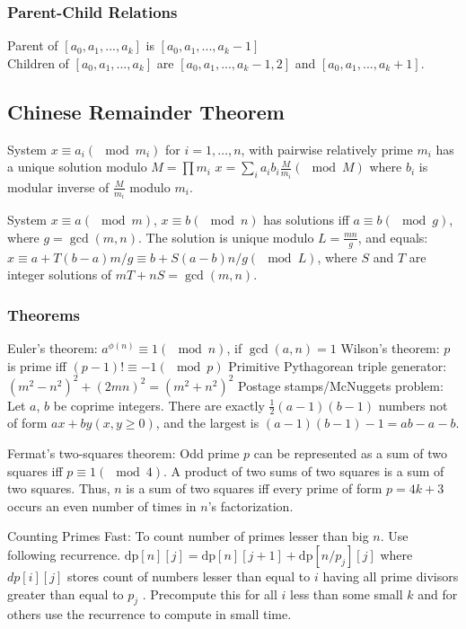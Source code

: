 \subsubsection{Parent-Child Relations}
Parent of $ [a_0, a_1, ..., a_k] $ is $ [a_0, a_1, ..., a_k-1] $ \\
Children of $[a_0, a_1, ..., a_k]$ are $[a_0, a_1, ..., a_k-1, 2]$ and $[a_0, a_1, ..., a_k+1]$.


\subsection{Chinese Remainder Theorem}

System $x \equiv a_i(\mod m_i)$ for $i = 1, \ldots, n$, with pairwise relatively prime $m_i$ has a unique solution modulo $M = \prod m_i$
$x=\sum_{i} a_ib_i\frac M{m_i} (\mod M)$ where $b_i$ is modular inverse of $\frac M{m_i}$ modulo $m_i$.

System $x \equiv a (\mod m)$, $x \equiv b (\mod n)$ has solutions iff $a \equiv b (\mod g)$, where $g = \gcd(m, n)$. The
solution is unique modulo $L = \frac{mn}{g}$, and equals: $x \equiv a + T (b − a)m/g \equiv b + S(a − b)n/g (\mod L)$,
where $S$ and $T$ are integer solutions of $mT + nS = \gcd(m, n)$.


\subsubsection{Theorems}

Euler's theorem: $a^{\phi(n)}\equiv 1(\mod n)$, if $\gcd(a,n)=1$
Wilson's theorem: $p$ is prime iff $(p-1)! \equiv -1(\mod p)$
Primitive Pythagorean triple generator: $(m^2-n^2)^2 + (2mn)^2 = (m^2+n^2)^2$
Postage stamps/McNuggets problem: Let $a$, $b$ be coprime integers. There are exactly $\frac 12(a−1)(b−1)$ numbers not of form $ax+by (x, y \geq 0)$, and the largest is $(a−1)(b−1)−1 = ab−a−b$.

Fermat’s two-squares theorem: Odd prime $p$ can be represented as a sum of two squares iff
$p \equiv 1 (\mod 4)$. A product of two sums of two squares is a sum of two squares. Thus, $n$ is a sum of
two squares iff every prime of form $p = 4k + 3$ occurs an even number of times in $n$’s factorization.

Counting Primes Fast:  To count number of primes lesser than big $n$. Use following recurrence.
$\text{dp}[n][j] =\text{dp}[n][j + 1] + \text{dp}[n/p_j][j]$ where $dp[i][j]$ stores count of numbers lesser than equal to $i$
having all prime divisors greater than equal to $p_j$ . Precompute this for all $i$ less than some small $k$
and for others use the recurrence to compute in small time.

